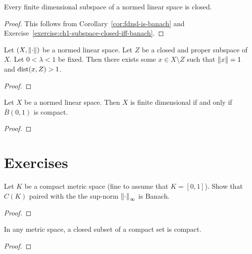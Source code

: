 \begin{corollary}\label{cor:fd-subspace-of-nls-is-closed}
    Every finite dimensional subspace of a normed linear space is closed.
\end{corollary}
    \begin{proof}
        This follows from Corollary~\ref{cor:fdnsl-is-banach} and Exercise~\ref{exercise:ch1-subspace-closed-iff-banach}.
    \end{proof}

\begin{lemma}\label{lemma:rieszs-lemma}
    Let $(X,\left\lVert \cdot \right\rVert)$ be a normed linear space. Let $Z$ be a closed and proper subspace of $X$. Let $0 < \lambda < 1$ be fixed. Then there exists some $x \in X \setminus Z$ such that $\left\lVert x \right\rVert = 1$ and $\operatorname{dist}(x,Z) > 1$.
\end{lemma}
    {\color{red} \begin{proof}
        
    \end{proof}}

\begin{theorem}
    Let $X$ be a normed linear space. Then $X$ is finite dimensional if and only if $\overline{B}(0,1)$ is compact.
\end{theorem}
    {\color{red} \begin{proof}
    
    \end{proof}}

\section*{Exercises}

\begin{exercise}
Let $K$ be a compact metric space (fine to assume that $K = [0,1]$). Show that $C(K)$ paired with the the sup-norm $\left\lVert \cdot \right\rVert_\infty$ is Banach.
\end{exercise}
    {\color{red} \begin{proof}
        
    \end{proof}}

\begin{exercise}
In any metric space, a closed subset of a compact set is compact.
\end{exercise}
    {\color{red} \begin{proof}
        
    \end{proof}}

